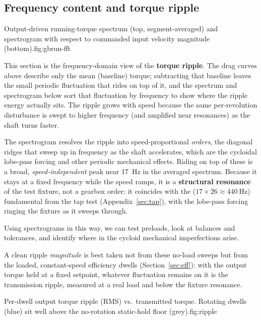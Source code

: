 \documentclass[11pt]{article}
\begin{document}
\subsection{Frequency content and torque ripple}
  {Output-driven running-torque spectrum (top, segment-averaged) and spectrogram with respect to commanded input velocity magnitude
   (bottom).}{fig:gbrun-fft}

This section is the frequency-domain view of the \textbf{torque ripple}. The drag
curves above describe only the mean (baseline) torque; subtracting that baseline
leaves the small periodic fluctuation that rides on top of it, and the spectrum and
spectrogram below sort that fluctuation by frequency to show where the ripple
energy actually sits. The ripple grows with speed because the same per-revolution
disturbance is swept to higher frequency (and amplified near resonances) as the
shaft turns faster.

The spectrogram resolves the ripple into speed-proportional \emph{orders}, the
diagonal ridges that sweep up in frequency as the shaft accelerates, which are
the cycloidal lobe-pass forcing and other periodic mechanical effects. Riding on top of these is a
broad, \emph{speed-independent} peak near \SI{17}{\hertz} in the averaged
spectrum. Because it stays at a fixed frequency while the speed ramps, it is a
\textbf{structural resonance} of the test fixture, not a gearbox order: it
coincides with the ($17\times26\approx\SI{440}{\Hz}$) fundamental from the tap test
(Appendix~\ref{sec:tap}), with the lobe-pass forcing ringing the fixture as it
sweeps through.

Using spectrograms in this way, we can test preloads, look at balances and tolerances, and identify where in the cycloid mechanical imperfections arise.

A clean ripple \emph{magnitude} is best taken not from these no-load sweeps but
from the loaded, constant-speed efficiency dwells (Section~\ref{sec:eff}): with the
output torque held at a fixed setpoint, whatever fluctuation remains on it is the
transmission ripple, measured at a real load and below the fixture resonance.

  {Per-dwell output torque ripple (RMS) vs.\ transmitted torque. Rotating dwells
   (blue) sit well above the no-rotation static-hold floor (grey).}{fig:ripple}
\end{document}
